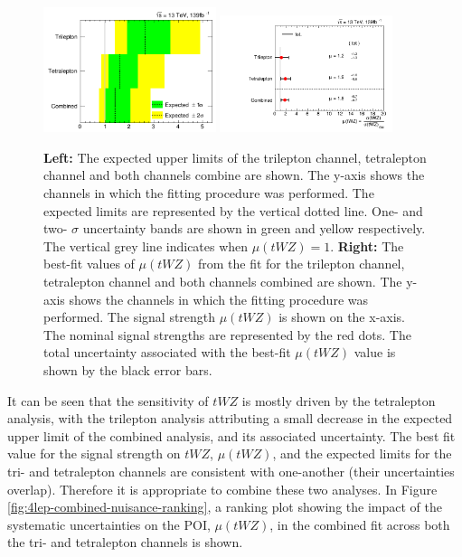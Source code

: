 \begin{figure}[h!]
    \centering
    \includegraphics[width=0.45\textwidth]{figures/combined/Limits.png}
     \includegraphics[width=0.45\textwidth]{figures/combined/POI_SigXsecOverSM_.png}
    \caption{\textbf{Left: }The expected upper limits of the trilepton channel, tetralepton channel and both channels combine are shown. The y-axis shows the channels in which the fitting procedure was performed. The expected limits are represented by the vertical dotted line. One- and two- $\sigma$ uncertainty bands are shown in green and yellow respectively. The vertical grey line indicates when $\mu (tWZ) = 1$. \textbf{Right: }The best-fit values of $\mu (tWZ)$ from the fit for the trilepton channel, tetralepton channel and both channels combined are shown. The y-axis shows the channels in which the fitting procedure was performed. The signal strength $\mu (tWZ)$ is shown on the x-axis. The nominal signal strengths are represented by the red dots. The total uncertainty associated with the best-fit $\mu (tWZ)$ value is shown by the black error bars.}
    \label{fig:combinedlimits}
\end{figure}It can be seen that the sensitivity of $tWZ$ is mostly driven by the tetralepton analysis, with the trilepton analysis attributing a small decrease in the expected upper limit of the combined analysis, and its associated uncertainty. The best fit value for the signal strength on $tWZ$, $\mu (tWZ)$, and the expected limits for the tri- and tetralepton channels are consistent with one-another (their uncertainties overlap). Therefore it is appropriate to combine these two analyses. In Figure \ref{fig:4lep-combined-nuisance-ranking}, a ranking plot showing the impact of the systematic uncertainties on the POI, $\mu (tWZ)$, in the combined fit across both the tri- and tetralepton channels is shown.
